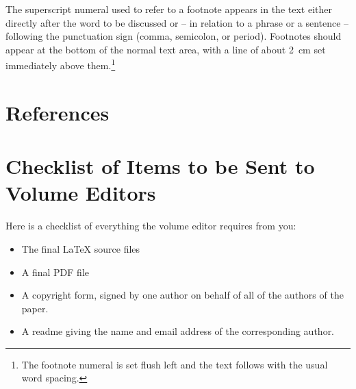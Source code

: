 \documentclass[runningheads,a4paper]{llncs}
\begin{document}
The superscript numeral used to refer to a footnote appears in the text
either directly after the word to be discussed or -- in relation to a
phrase or a sentence -- following the punctuation sign (comma,
semicolon, or period). Footnotes should appear at the bottom of
the
normal text area, with a line of about 2~cm set
immediately above them.\footnote{The footnote numeral is set flush left
and the text follows with the usual word spacing.}

\medskip

\newpage

\section{References}\label{references}


\section{Checklist of Items to be Sent to Volume Editors}
Here is a checklist of everything the volume editor requires from you:

\begin{itemize}
\settowidth{\leftmargin}{{\Large$\square$}}\advance\leftmargin{}
\itemsep8pt\relax
\renewcommand\labelitemi{{\lower1.5pt\hbox{\Large$\square$}}}

\item The final \LaTeX{} source files
\item A final PDF file
\item A copyright form, signed by one author on behalf of all of the
authors of the paper.
\item A readme giving the name and email address of the
corresponding author.
\end{itemize}
\end{document}

